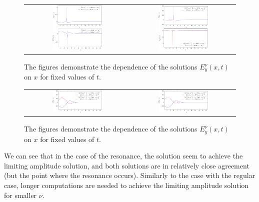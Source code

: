 \begin{figure}
\begin{tabular}{cc}
\includegraphics[width=0.5\textwidth]{res/ex_fixed_t-crop.pdf}&
\includegraphics[width=0.5\textwidth]{res/ex_fixed_t_1e3-crop.pdf}
\end{tabular}
\caption{The figures demonstrate the dependence of the solutions 
$E_y^{\nu}(x,t)$ on $x$ for fixed values of $t$. }
\label{fig:resonance_nus_ex_t}
\end{figure}
\begin{figure}
\begin{tabular}{cc}
\includegraphics[width=0.5\textwidth]{res/ey_fixed_t-crop.pdf}&
\includegraphics[width=0.5\textwidth]{res/ey_fixed_t_1e3-crop.pdf}
 \end{tabular}
\caption{The figures demonstrate the dependence of the solutions 
$E_y^{\nu}(x,t)$ on $x$ for fixed values of $t$. }
\label{fig:resonance_nus_ey_t}
\end{figure}

We can see that in the case of the resonance, the solution seem to achieve the limiting amplitude solution, 
and both solutions are in relatively close agreement (but the point where the resonance occurs). 
Similarly to the case with the regular case, 
longer computations are needed to achieve the limiting amplitude solution  
for smaller $\nu$.

